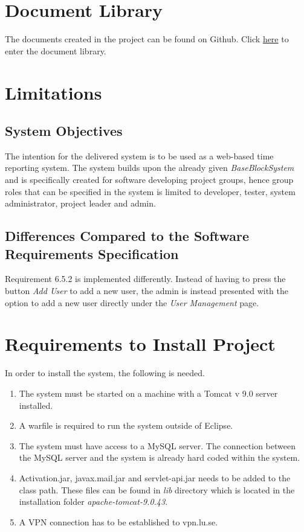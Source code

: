 \documentclass{article}
\begin{document}
\section{Document Library}
The documents created in the project can be found on Github. Click \href{https://github.com/puspgroup2/document-library/tree/master/Documents}{here} to enter the document library. \\ 

\section{Limitations}


\subsection{System Objectives}
The intention for the delivered system is to be used as a web-based time reporting system. The system builds upon the already given \textit{BaseBlockSystem} and is specifically created for software developing project groups, hence group roles that can be specified in the system is limited to developer, tester, system administrator, project leader and admin.

\subsection{Differences Compared to the Software Requirements Specification}
Requirement 6.5.2 is implemented differently. Instead of having to press  the button \textit{Add User} to add a new user, the admin is instead presented with the option to add a new user directly under the \textit{User Management} page.


\section{Requirements to Install Project}
In order to install the system, the following is needed.
\begin{enumerate}

    \item The system must be started on a machine with a Tomcat v 9.0 server installed.
    
    \item A warfile is required to run the system outside of Eclipse.
    
    \item  The system must have access to a MySQL server. The connection between the MySQL server and the system is already hard coded within the system.
    
    \item Activation.jar, javax.mail.jar and servlet-api.jar needs to be added to the class path. These files can be found in \textit{lib} directory which is located in the installation folder \textit{apache-tomcat-9.0.43}.
    
    \item A VPN connection has to be established to vpn.lu.se.
    
    
    \end{enumerate}
    
\end{document}
